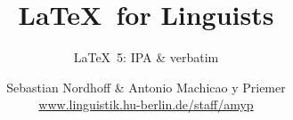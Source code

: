 


\title{
	\LaTeX\ for Linguists
}

\subtitle{\LaTeX\ 5: IPA \& verbatim}

\author[aMyP]{
	{\small Sebastian Nordhoff \& Antonio Machicao y Priemer}
	\\
	{\footnotesize \url{www.linguistik.hu-berlin.de/staff/amyp}}
}








\begin{frame}
  \HUtitle
\end{frame}





\nocite{Freitag&MyP15a}
\nocite{Knuth1986}
\nocite{Kopka94a}
	


%
%
%
%
%


